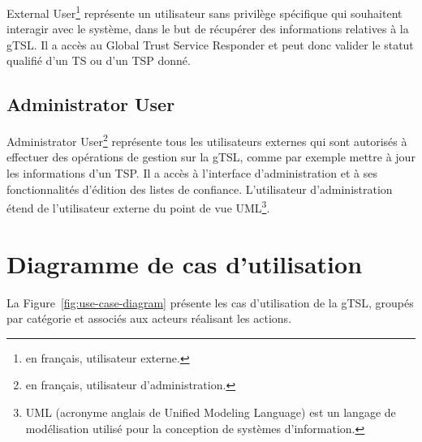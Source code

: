 \documentclass{tnreport}
\begin{document}
External User\footnote{en français, utilisateur externe.} représente un utilisateur sans privilège spécifique qui souhaitent interagir avec le système, dans le but de récupérer des informations relatives à la gTSL. Il a accès au Global Trust Service Responder et peut donc valider le statut qualifié d'un TS ou d'un TSP donné.

\subsection{Administrator User}

Administrator User\footnote{en français, utilisateur d'administration.} représente tous les utilisateurs externes qui sont autorisés à effectuer des opérations de gestion sur la gTSL, comme par exemple mettre à jour les informations d'un TSP. Il a accès à l'interface d'administration et à ses fonctionnalités d'édition des listes de confiance. L'utilisateur d'administration étend de l'utilisateur externe du point de vue UML\footnote{UML (acronyme anglais de Unified Modeling Language) est un langage de modélisation utilisé pour la conception de systèmes d'information.}.

\section{Diagramme de cas d'utilisation}

La Figure~\ref{fig:use-case-diagram} présente les cas d'utilisation de la gTSL, groupés par catégorie et associés aux acteurs réalisant les actions.
\end{document}
